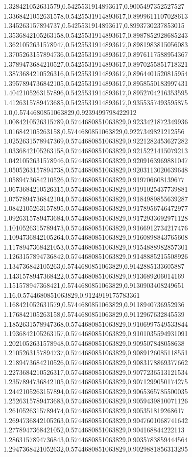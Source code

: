 1.328421052631579,0.5425531914893617,0.9005497352527527
1.3368421052631578,0.5425531914893617,0.8999611107028613
1.345263157894737,0.5425531914893617,0.8993730237853015
1.3536842105263158,0.5425531914893617,0.8987852928685243
1.3621052631578947,0.5425531914893617,0.8981983815056083
1.3705263157894736,0.5425531914893617,0.8976117588954367
1.3789473684210527,0.5425531914893617,0.8970255851718321
1.3873684210526316,0.5425531914893617,0.8964401520815954
1.3957894736842105,0.5425531914893617,0.8958550183997431
1.4042105263157896,0.5425531914893617,0.8952704216353595
1.4126315789473685,0.5425531914893617,0.9355357493595875
1.0,0.5744680851063829,0.9239499798422912
1.0084210526315789,0.5744680851063829,0.9233421872349936
1.016842105263158,0.5744680851063829,0.9227349821212556
1.0252631578947369,0.5744680851063829,0.9221282453627282
1.0336842105263158,0.5744680851063829,0.9215221415079213
1.0421052631578946,0.5744680851063829,0.9209163969881047
1.0505263157894738,0.5744680851063829,0.9203113020639648
1.0589473684210526,0.5744680851063829,0.919706608139677
1.0673684210526315,0.5744680851063829,0.9191025437739881
1.0757894736842104,0.5744680851063829,0.9184989855639287
1.0842105263157895,0.5744680851063829,0.9178956746472977
1.0926315789473684,0.5744680851063829,0.9172933692971128
1.1010526315789473,0.5744680851063829,0.9166912734217476
1.1094736842105264,0.5744680851063829,0.9160898843765608
1.1178947368421053,0.5744680851063829,0.9154888982857301
1.1263157894736842,0.5744680851063829,0.9148885215508926
1.134736842105263,0.5744680851063829,0.9142885133605887
1.1431578947368422,0.5744680851063829,0.913689206014169
1.151578947368421,0.5744680851063829,0.9130903408249651
1.16,0.5744680851063829,0.9124919175783361
1.168421052631579,0.5744680851063829,0.9118940736952936
1.176842105263158,0.5744680851063829,0.9112967632845539
1.1852631578947368,0.5744680851063829,0.9106997549533844
1.1936842105263157,0.5744680851063829,0.9101035594931091
1.2021052631578948,0.5744680851063829,0.909507848058638
1.2105263157894737,0.5744680851063829,0.9089126085118551
1.2189473684210526,0.5744680851063829,0.9083178869377662
1.2273684210526317,0.5744680851063829,0.9077236513121534
1.2357894736842105,0.5744680851063829,0.9071299050174275
1.2442105263157894,0.5744680851063829,0.9065365785500035
1.2526315789473683,0.5744680851063829,0.9059439810071126
1.2610526315789474,0.5744680851063829,0.905351819268617
1.2694736842105263,0.5744680851063829,0.9047601068741642
1.2778947368421052,0.5744680851063829,0.904168844222113
1.2863157894736843,0.5744680851063829,0.9035783859444564
1.2947368421052632,0.5744680851063829,0.9029881856313295

